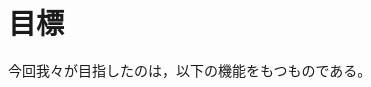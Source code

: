 \documentclass[report.tex]{subfiles}
\begin{document}
\section{目標}
今回我々が目指したのは，以下の機能をもつものである。
\end{document}
